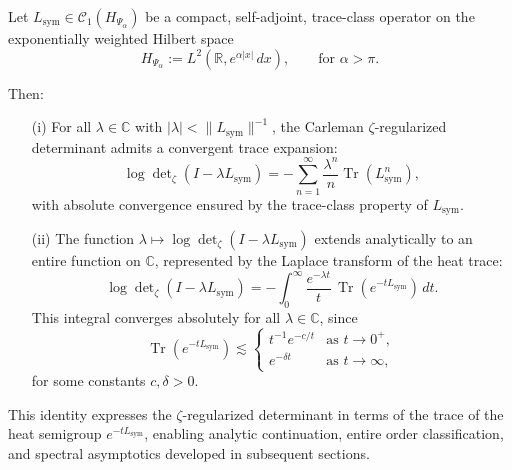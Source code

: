 \begin{lemma}
\label{lem:det_via_heat_trace}
Let \( L_{\mathrm{sym}} \in \mathcal{C}_1(H_{\Psi_\alpha}) \) be a compact, self-adjoint, trace-class operator on the exponentially weighted Hilbert space
\[
H_{\Psi_\alpha} := L^2(\mathbb{R}, e^{\alpha |x|} \, dx), \qquad \text{for } \alpha > \pi.
\]

Then:
\begin{enumerate}
  \item[\textnormal{(i)}] For all \( \lambda \in \mathbb{C} \) with \( |\lambda| < \|L_{\mathrm{sym}}\|^{-1} \), the Carleman \(\zeta\)-regularized determinant admits a convergent trace expansion:
  \[
  \log \det\nolimits_{\zeta}(I - \lambda L_{\mathrm{sym}})
  = - \sum_{n=1}^\infty \frac{\lambda^n}{n} \operatorname{Tr}(L_{\mathrm{sym}}^n),
  \]
  with absolute convergence ensured by the trace-class property of \( L_{\mathrm{sym}} \).

  \item[\textnormal{(ii)}] The function \( \lambda \mapsto \log \det\nolimits_\zeta(I - \lambda L_{\mathrm{sym}}) \) extends analytically to an entire function on \( \mathbb{C} \), represented by the Laplace transform of the heat trace:
  \[
  \log \det\nolimits_\zeta(I - \lambda L_{\mathrm{sym}})
  = - \int_0^\infty \frac{e^{-\lambda t}}{t} \, \operatorname{Tr}(e^{-t L_{\mathrm{sym}}}) \, dt.
  \]
  This integral converges absolutely for all \( \lambda \in \mathbb{C} \), since
  \[
  \operatorname{Tr}(e^{-t L_{\mathrm{sym}}}) \lesssim
  \begin{cases}
    t^{-1} e^{-c/t} & \text{as } t \to 0^+, \\
    e^{-\delta t}   & \text{as } t \to \infty,
  \end{cases}
  \]
  for some constants \( c, \delta > 0 \).
\end{enumerate}

\medskip
\noindent
This identity expresses the \(\zeta\)-regularized determinant in terms of the trace of the heat semigroup \( e^{-t L_{\mathrm{sym}}} \), enabling analytic continuation, entire order classification, and spectral asymptotics developed in subsequent sections.
\end{lemma}
